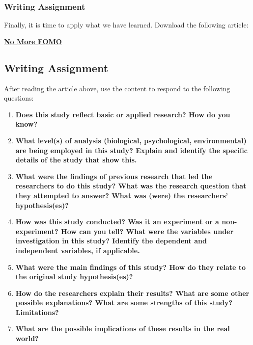 \documentclass[
]{book}
\begin{document}
\hypertarget{writing-assignment}{%
\subsubsection*{Writing Assignment}\label{writing-assignment}}

Finally, it is time to apply what we have learned. Download the following article:

\href{assets/unit_4/Assessment_FOMO_Article.pdf}{\textbf{No More FOMO}}

\hypertarget{writing-assignment-2}{%
\subsection*{Writing Assignment}\label{writing-assignment-2}}

After reading the article above, use the content to respond to the following questions:

\begin{enumerate}
\def\labelenumi{\arabic{enumi}.}
\item
  \textbf{Does this study reflect basic or applied research? How do you know?}
\item
  \textbf{What level(s) of analysis (biological, psychological, environmental) are being employed in this study? Explain and identify the specific details of the study that show this.}
\item
  \textbf{What were the findings of previous research that led the researchers to do this study? What was the research question that they attempted to answer? What was (were) the researchers' hypothesis(es)?}
\item
  \textbf{How was this study conducted? Was it an experiment or a non-experiment? How can you tell? What were the variables under investigation in this study? Identify the dependent and independent variables, if applicable.}
\item
  \textbf{What were the main findings of this study? How do they relate to the original study hypothesis(es)?}
\item
  \textbf{How do the researchers explain their results? What are some other possible explanations? What are some strengths of this study? Limitations?}
\item
  \textbf{What are the possible implications of these results in the real world?}
\end{enumerate}
\end{document}
